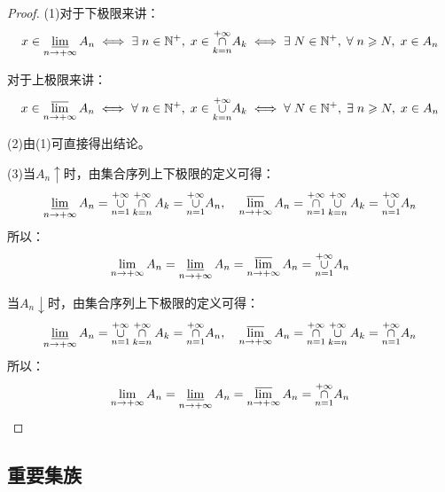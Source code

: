 \begin{proof}
	(1)对于下极限来讲：
	\begin{equation*}
		x\in\varliminf_{n\to+\infty}A_n
		\iff
		\exists\;n\in\mathbb{N}^+,\;x\in\underset{k=n}{\overset{+\infty}{\cap}}A_k
		\iff
		\exists\;N\in\mathbb{N}^+,\;\forall\;n\geqslant N,\;x\in A_n
	\end{equation*}\par
	对于上极限来讲：
	\begin{equation*}
		x\in\varlimsup_{n\to+\infty}A_n
		\iff
		\forall\;n\in\mathbb{N}^+,\;x\in\underset{k=n}{\overset{+\infty}{\cup}}A_k
		\iff
		\forall\;N\in\mathbb{N}^+,\;\exists\;n\geqslant N,\;x\in A_n
	\end{equation*}\par
	(2)由(1)可直接得出结论。\par
	(3)当$A_n\uparrow$时，由集合序列上下极限的定义可得：
	\begin{equation*}
		\varliminf_{n\to+\infty}A_n=\underset{n=1}{\overset{+\infty}{\cup}}\underset{k=n}{\overset{+\infty}{\cap}}A_k=\underset{n=1}{\overset{+\infty}{\cup}}A_n,\quad\varlimsup_{n\to+\infty}A_n=\underset{n=1}{\overset{+\infty}{\cap}}\underset{k=n}{\overset{+\infty}{\cup}}A_k=\underset{n=1}{\overset{+\infty}{\cup}}A_n
	\end{equation*}
	所以：
	\begin{equation*}
		\lim_{n\to+\infty}A_n=\varliminf_{n\to+\infty}A_n=\varlimsup_{n\to+\infty}A_n=\underset{n=1}{\overset{+\infty}{\cup}}A_n
	\end{equation*}\par
	当$A_n\downarrow$时，由集合序列上下极限的定义可得：
	\begin{equation*}
		\varliminf_{n\to+\infty}A_n=\underset{n=1}{\overset{+\infty}{\cup}}\underset{k=n}{\overset{+\infty}{\cap}}A_k=\underset{n=1}{\overset{+\infty}{\cap}}A_n,\quad\varlimsup_{n\to+\infty}A_n=\underset{n=1}{\overset{+\infty}{\cap}}\underset{k=n}{\overset{+\infty}{\cup}}A_k=\underset{n=1}{\overset{+\infty}{\cap}}A_n
	\end{equation*}
	所以：
	\begin{equation*}
		\lim_{n\to+\infty}A_n=\varliminf_{n\to+\infty}A_n=\varlimsup_{n\to+\infty}A_n=\underset{n=1}{\overset{+\infty}{\cap}}A_n\qedhere
	\end{equation*}
\end{proof}

\subsection{重要集族}
